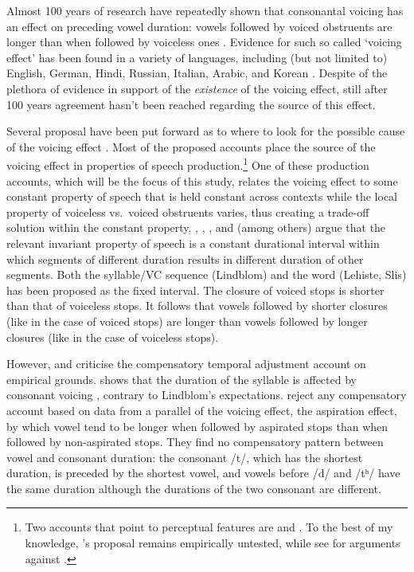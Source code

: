 \documentclass[]{JASAnew}
\begin{document}
Almost 100 years of research have repeatedly shown that consonantal
voicing has an effect on preceding vowel duration: vowels followed by
voiced obstruents are longer than when followed by voiceless ones
\citep{heffner1937, house1953, belasco1953, peterson1960, halle1967, chen1970, klatt1973, lisker1974, raphael1975, javkin1976, maddieson1976, farnetani1986, kluender1988, laeufer1992, fowler1992, hussein1994, esposito2002, lampp2004, warren2005, durvasula2012}.
Evidence for such so called `voicing effect' has been found in a variety
of languages, including (but not limited to) English, German, Hindi,
Russian, Italian, Arabic, and Korean \citep[see][ for a more
comprehensive, but still not exhaustive list]{maddieson1976}. Despite of
the plethora of evidence in support of the \emph{existence} of the
voicing effect, still after 100 years agreement hasn't been reached
regarding the source of this effect.

Several proposal have been put forward as to where to look for the
possible cause of the voicing effect \citep[see][ and
\citet{soskuthy2013} for an overview]{maddieson1976}. Most of the
proposed accounts place the source of the voicing effect in properties
of speech
production.\footnote{Two accounts that point to perceptual features are \citet{javkin1976} and \citet{kluender1988}. To the best of my knowledge, \citet{javkin1976}'s proposal remains empirically untested, while see \citet{fowler1992} for arguments against \citet{kluender1988}.}
One of these production accounts, which will be the focus of this study,
relates the voicing effect to some constant property of speech that is
held constant across contexts while the local property of voiceless
vs.~voiced obstruents varies, thus creating a trade-off solution within
the constant property. \citet{lindblom1967}, \citet{slis1969a},
\citet{slis1969}, and \citet{lehiste1970} (among others) argue that the
relevant invariant property of speech is a constant durational interval
within which segments of different duration results in different
duration of other segments. Both the syllable/VC sequence (Lindblom) and
the word (Lehiste, Slis) has been proposed as the fixed interval. The
closure of voiced stops is shorter than that of voiceless stops. It
follows that vowels followed by shorter closures (like in the case of
voiced stops) are longer than vowels followed by longer closures (like
in the case of voiceless stops).

However, \citet{chen1970} and \citet{maddieson1976} criticise the
compensatory temporal adjustment account on empirical grounds.
\citet{chen1970} shows that the duration of the syllable is affected by
consonant voicing \citep[compatible with findings in][]{jacewicz2009},
contrary to Lindblom's expectations. \citet{maddieson1976} reject any
compensatory account based on data from a parallel of the voicing
effect, the aspiration effect, by which vowel tend to be longer when
followed by aspirated stops than when followed by non-aspirated stops.
They find no compensatory pattern between vowel and consonant duration:
the consonant /t/, which has the shortest duration, is preceded by the
shortest vowel, and vowels before /d/ and /tʰ/ have the same duration
although the durations of the two consonant are different.
\end{document}
